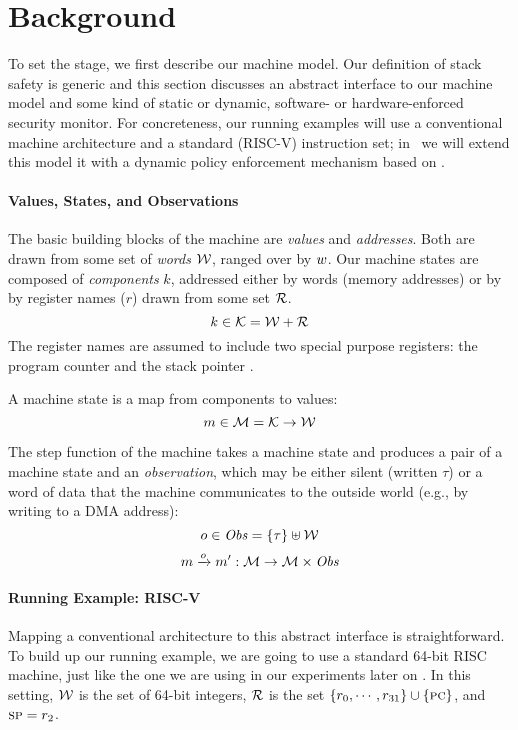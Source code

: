 \documentclass[acmsmall,review,anonymous]{acmart}\settopmatter{printfolios=true,printccs=false,printacmref=false}
\begin{document}
\section{Background}
\label{sec:prelim}

To set the stage, we first
describe our machine model. Our definition of stack safety is
generic and this section discusses an abstract interface to our
machine model and some kind of static or dynamic, software- or
hardware-enforced security monitor.  For
concreteness, our running examples will use a
conventional machine architecture and a standard (RISC-V) instruction set;
in~ we will
extend this model it with a dynamic policy enforcement mechanism based
on .

\paragraph*{Values, States, and Observations}

The basic building blocks of the machine are {\em values} and {\em
  addresses}. Both are drawn from some set of {\em words}
${\mathcal W}$, ranged over by $w$.
%
Our machine states are composed of {\em components} $k$, addressed either by
words (memory addresses) or by by register names ($r$) drawn from some set
${\mathcal R}$.
%
    \[k \in {\mathcal K} = {\mathcal W} + {\mathcal R} \]
%
The register names are assumed to include two special purpose registers: the
program counter {\PCname} and the stack pointer \SP.

A machine state is a map from components to values:
%
\[m \in {\mathcal M} = {\mathcal K} \rightarrow {\mathcal W}\]

The step function of the
machine takes a machine state and produces a pair of a
machine state and an {\em observation}, which may be either
silent (written $\tau$) or a word of data that the machine communicates to
the outside world (e.g., by writing to a DMA address):
%
\[o \in \mathit{Obs} = \{\tau\} \uplus {\mathcal W}\]
\[m \xrightarrow{o} m' : {\mathcal M} \rightarrow {\mathcal M} \times \mathit{Obs} \]
%

\paragraph*{Running Example: RISC-V}

Mapping a conventional architecture to this abstract interface is
straightforward. To build up our running example, we are going to use
a standard 64-bit RISC machine, just like the one we are using in our
experiments later on . In this setting, ${\mathcal W}$
is the set of 64-bit integers, ${\mathcal R}$ is the set $\{r_0, \cdots,
r_{31}\} \cup \{\textsc{pc}\}$, and $\textsc{sp} = r_2$.
\end{document}
